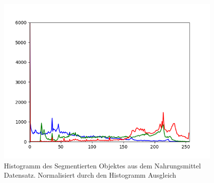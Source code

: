 \documentclass[a4paper,12pt,oneside]{article}
\begin{document}
\begin{figure}[htb]
\begin{minipage}[c]{0.08\textwidth}
\end{minipage}
\hfill
\begin{minipage}[c]{0.3\textwidth}
\includegraphics[width=\textwidth]{Sources/Bild3_HA_histo.png}
\end{minipage}
\caption{Histogramm des Segmentierten Objektes aus dem Nahrungsmittel Datensatz. Normalisiert durch den Histogramm Ausgleich}
\label{img:evalHA}
\end{figure}
\newpage
\end{document}
